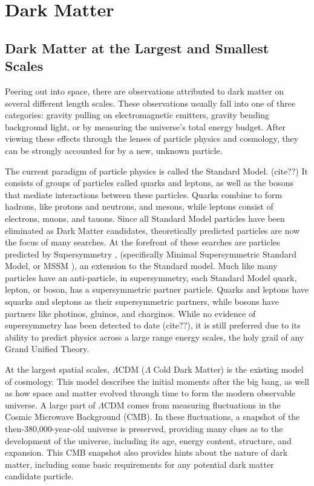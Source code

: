 \cleartooddpage[\thispagestyle{empty}]
\chapter{Dark Matter}

\section{Dark Matter at the Largest and Smallest Scales} %
  Peering out into space, there are observations attributed to dark matter on several different length scales.
  These observations usually fall into one of three categories: gravity pulling on electromagnetic emitters, gravity bending background light, or by measuring the universe's total energy budget.
  After viewing these effects through the lenses of particle physics and cosmology, they can be strongly accounted for by a new, unknown particle.

  The current paradigm of particle physics is called the Standard Model. {\color{red}(cite??)}
  It consists of groups of particles called quarks and leptons, as well as the bosons that mediate interactions between these particles.
  Quarks combine to form hadrons, like protons and neutrons, and mesons, while leptons consist of electrons, muons, and tauons.
  Since all Standard Model particles have been eliminated as Dark Matter candidates, theoretically predicted particles are now the focus of many searches.
  At the forefront of these searches are particles predicted by Supersymmetry \cite{Jungman:1995df}, (specifically Minimal Supersymmetric Standard Model, or MSSM \cite{MSSM}), an extension to the Standard model.
  Much like many particles have an anti-particle, in supersymmetry, each Standard Model quark, lepton, or boson, has a supersymmetric partner particle.
  Quarks and leptons have squarks and sleptons as their supersymmetric partners, while bosons have partners like photinos, gluinos, and charginos.
  While no evidence of supersymmetry has been detected to date {\color{red}(cite??)}, it is still preferred due to its ability to predict physics across a large range energy scales, the holy grail of any Grand Unified Theory.

  At the largest spatial scales, $\Lambda$CDM ($\Lambda$ Cold Dark Matter) is the existing model of cosmology.
  This model describes the initial moments after the big bang, as well as how space and matter evolved through time to form the modern observable universe.
  A large part of $\Lambda$CDM comes from measuring fluctuations in the Cosmic Microwave Background (CMB).
  In these fluctuations, a snapshot of the then-380,000-year-old universe is preserved, providing many clues as to the development of the universe, including its age, energy content, structure, and expansion. %
  This CMB snapshot also provides hints about the nature of dark matter, including some basic requirements for any potential dark matter candidate particle.


